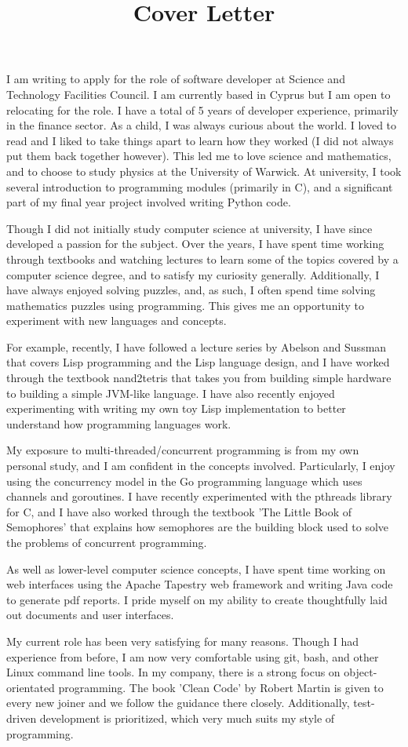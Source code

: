 \documentclass[11pt]{article}
\title{Cover Letter}
\date{}
\begin{document}
I am writing to apply for the role of software developer at Science and Technology Facilities Council. I am currently based in Cyprus but I am open to relocating for the role. I have a total of 5 years of developer experience, primarily in the finance sector. As a child, I was always curious about the world. I loved to read and I liked to take things apart to learn how they worked (I did not always put them back together however). This led me to love science and mathematics, and to choose to study physics at the University of Warwick. At university, I took several introduction to programming modules (primarily in C), and a significant part of my final year project involved writing Python code.

Though I did not initially study computer science at university, I have since developed a passion for the subject. Over the years, I have spent time working through textbooks and watching lectures to learn some of the topics covered by a computer science degree, and to satisfy my curiosity generally. Additionally, I have always enjoyed solving puzzles, and, as such, I often spend time solving mathematics puzzles using programming. This gives me an opportunity to experiment with new languages and concepts.

For example, recently, I have followed a lecture series by Abelson and Sussman that covers Lisp programming and the Lisp language design, and I have worked through the textbook nand2tetris that takes you from building simple hardware to building a simple JVM-like language. I have also recently enjoyed experimenting with writing my own toy Lisp implementation to better understand how programming languages work. 

My exposure to multi-threaded/concurrent programming is from my own personal study, and I am confident in the concepts involved. Particularly, I enjoy using the concurrency model in the Go programming language which uses channels and goroutines. I have recently experimented with the pthreads library for C, and I have also worked through the textbook 'The Little Book of Semophores' that explains how semophores are the building block used to solve the problems of concurrent programming. 

As well as lower-level computer science concepts, I have spent time working on web interfaces using the Apache Tapestry web framework and writing Java code to generate pdf reports. I pride myself on my ability to create thoughtfully laid out documents and user interfaces.

My current role has been very satisfying for many reasons. Though I had experience from before, I am now very comfortable using git, bash, and other Linux command line tools. In my company, there is a strong focus on object-orientated programming. The book 'Clean Code' by Robert Martin is given to every new joiner and we follow the guidance there closely. Additionally, test-driven development is prioritized, which very much suits my style of programming. 
\end{document}

